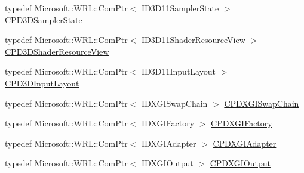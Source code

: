 \begin{DoxyCompactItemize}
\item 
typedef Microsoft\+::\+W\+R\+L\+::\+Com\+Ptr$<$ I\+D3\+D11\+Sampler\+State $>$ \hyperlink{namespace_m_n_l_ae0141196161ecb3d3055523077ca3aa1}{C\+P\+D3\+D\+Sampler\+State}
\item 
typedef Microsoft\+::\+W\+R\+L\+::\+Com\+Ptr$<$ I\+D3\+D11\+Shader\+Resource\+View $>$ \hyperlink{namespace_m_n_l_a93794d93663474ff79c950ed985565aa}{C\+P\+D3\+D\+Shader\+Resource\+View}
\item 
typedef Microsoft\+::\+W\+R\+L\+::\+Com\+Ptr$<$ I\+D3\+D11\+Input\+Layout $>$ \hyperlink{namespace_m_n_l_aec7a2a132d6e72492d5feb5926d838dd}{C\+P\+D3\+D\+Input\+Layout}
\item 
typedef Microsoft\+::\+W\+R\+L\+::\+Com\+Ptr$<$ I\+D\+X\+G\+I\+Swap\+Chain $>$ \hyperlink{namespace_m_n_l_a5e8905e111c1a9d829a86fc3cc3420ec}{C\+P\+D\+X\+G\+I\+Swap\+Chain}
\item 
typedef Microsoft\+::\+W\+R\+L\+::\+Com\+Ptr$<$ I\+D\+X\+G\+I\+Factory $>$ \hyperlink{namespace_m_n_l_a8bb070ff80c5e3a874d942fbc31c22ab}{C\+P\+D\+X\+G\+I\+Factory}
\item 
typedef Microsoft\+::\+W\+R\+L\+::\+Com\+Ptr$<$ I\+D\+X\+G\+I\+Adapter $>$ \hyperlink{namespace_m_n_l_ab0e24805043a50c45364c389f8929f33}{C\+P\+D\+X\+G\+I\+Adapter}
\item 
typedef Microsoft\+::\+W\+R\+L\+::\+Com\+Ptr$<$ I\+D\+X\+G\+I\+Output $>$ \hyperlink{namespace_m_n_l_ac03add2215d9e5f2938af7887c5b09de}{C\+P\+D\+X\+G\+I\+Output}
\end{DoxyCompactItemize}
